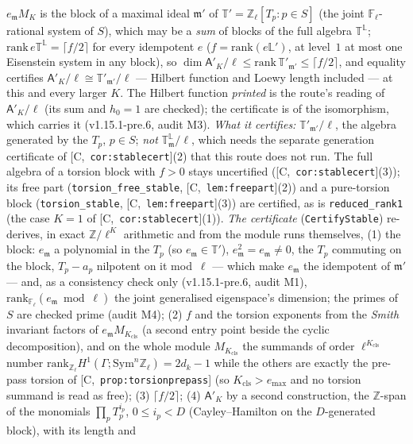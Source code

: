 \documentclass[11pt]{article}
\theoremstyle{remark}
\newcommand{\F}{\mathbb{F}}
\newcommand{\Z}{\mathbb{Z}}
\newcommand{\Sym}{\mathrm{Sym}}
\newcommand{\Ga}{\Gamma}
\newcommand{\Fl}{\F_\ell}
\newcommand{\m}{\mathfrak{m}}
\newcommand{\HA}[1]{[C,~\texttt{#1}]}      %
\begin{document}
\begin{enumerate}
  $e_\m M_K$ is the block of a maximal ideal $\m'$ of $\mathbb{T}'=\Z_\ell[T_p:p\in S]$ (the joint $\Fl$-rational system of $S$), which may be a \emph{sum} of
  blocks of the full algebra $\mathbb{T}^{\mathbb L}$; $\mathrm{rank}\,e\mathbb{T}^{\mathbb L}=\lceil f/2\rceil$ for every idempotent $e$ ($f=\mathrm{rank}(e\mathbb L')$,
  at level~$1$ at most one Eisenstein system in any block), so $\dim\mathsf A'_K/\ell\le\mathrm{rank}\,\mathbb{T}'_{\m'}\le\lceil f/2\rceil$, and
  equality certifies $\mathsf A'_K/\ell\cong\mathbb{T}'_{\m'}/\ell$ --- Hilbert function and Loewy length included --- at this and every larger $K$.
  The Hilbert function \emph{printed} is the route's reading of $\mathsf A'_K/\ell$ (its sum and $h_0=1$ are checked); the certificate is of the
  isomorphism, which carries it (v1.15.1-pre.6, audit M3).
  \emph{What it certifies:} $\mathbb{T}'_{\m'}/\ell$, the algebra generated by the $T_p$, $p\in S$; \emph{not} $\mathbb{T}^{\mathbb L}_\m/\ell$, which needs the
  separate generation certificate of \HA{cor:stablecert}(2) that this route does not run. The full algebra of a torsion block with $f>0$ stays
  uncertified (\HA{cor:stablecert}(3)); its free part (\texttt{torsion\_free\_stable}, \HA{lem:freepart}(2)) and a pure-torsion block
  (\texttt{torsion\_stable}, \HA{lem:freepart}(3)) are certified, as is \texttt{reduced\_rank1} (the case $K=1$ of \HA{cor:stablecert}(1)).
  \emph{The certificate} (\texttt{CertifyStable}) re-derives, in exact $\Z/\ell^{K}$ arithmetic and from the module runs themselves, (1) the block:
  $e_\m$ a polynomial in the $T_p$ (so $e_\m\in\mathbb{T}'$), $e_\m^2=e_\m\ne0$, the $T_p$ commuting on the block, $T_p-a_p$ nilpotent on it mod~$\ell$
  --- which make $e_\m$ the idempotent of $\m'$ --- and, as a consistency check only (v1.15.1-pre.6, audit M1), $\mathrm{rank}_{\Fl}(e_\m\bmod\ell)$ the joint
  generalised eigenspace's dimension; the primes of $S$ are checked prime (audit M4); (2) $f$ and the torsion exponents from the \emph{Smith} invariant
  factors of $e_\m M_{K_{\mathrm{cls}}}$ (a second entry point beside the cyclic decomposition), and on the whole module
  $M_{K_{\mathrm{cls}}}$ the summands of order $\ell^{K_{\mathrm{cls}}}$ number $\mathrm{rank}_{\Z_\ell}H^1(\Ga;\Sym^n\Z_\ell)=2d_k-1$ while the others are
  exactly the pre-pass torsion of \HA{prop:torsionprepass} (so $K_{\mathrm{cls}}>e_{\max}$ and no torsion summand is read as free); (3) $\lceil f/2\rceil$; (4) $\mathsf A'_K$ by a second
  construction, the $\Z$-span of the monomials $\prod_pT_p^{i_p}$, $0\le i_p<D$ (Cayley--Hamilton on the $D$-generated block), with its length and

\end{enumerate}
\end{document}
